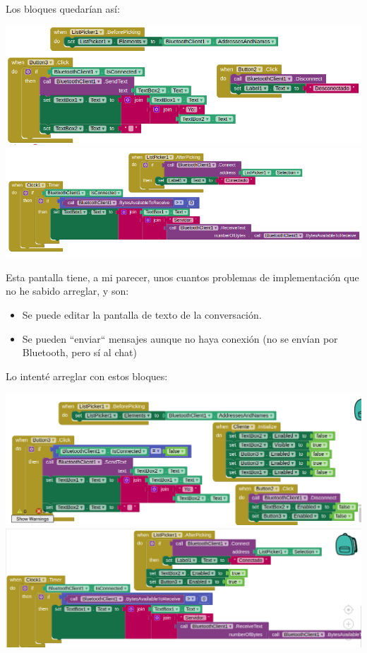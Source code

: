 \documentclass{article}
\begin{document}
Los bloques quedarían así:

\begin{flushleft}
	\includegraphics[scale=0.4]{imagenes/Cliente1.png} 
	\includegraphics[scale=0.4]{imagenes/Cliente2.png} 
\end{flushleft}

Esta pantalla tiene, a mi parecer, unos cuantos problemas de implementación que no he sabido arreglar, y son:
\begin{itemize}
	\item Se puede editar la pantalla de texto de la conversación.
	\item Se pueden ``enviar`` mensajes aunque no haya conexión (no se envían por Bluetooth, pero sí al chat)
\end{itemize}

Lo intenté arreglar con estos bloques:

\begin{flushleft}
	\includegraphics[scale=0.4]{imagenes/Cliente_1.png} 
	\includegraphics[scale=0.4]{imagenes/Cliente_2.png} 
\end{flushleft}
\end{document}
